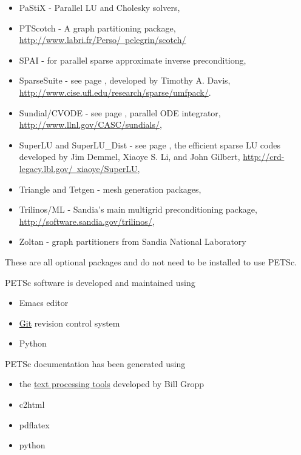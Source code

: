 \begin{itemize}
  \item PaStiX -     Parallel LU and Cholesky solvers,
  \item PTScotch -    A graph partitioning package, \href{http://www.labri.fr/Perso/~pelegrin/scotch/}{http://www.labri.fr/Perso/~pelegrin/scotch/}
  \item SPAI -        for parallel sparse approximate inverse preconditiong,
  \item SparseSuite - see page \pageref{sec_externalsol},  developed by Timothy A. Davis,
                    \href{http://www.cise.ufl.edu/research/sparse/umfpack/}{http://www.cise.ufl.edu/research/sparse/umfpack/}.
  \item Sundial/CVODE - see page \pageref{sec_sundials}, parallel ODE integrator,
                     \href{http://www.llnl.gov/CASC/sundials/}{http://www.llnl.gov/CASC/sundials/},
  \item SuperLU and SuperLU\_Dist - see page \pageref{sec_externalsol},
                    the efficient sparse LU codes developed by Jim Demmel,  Xiaoye S. Li, and John Gilbert,
                    \href{http://crd-legacy.lbl.gov/~xiaoye/SuperLU}{http://crd-legacy.lbl.gov/~xiaoye/SuperLU},
  \item Triangle and Tetgen - mesh generation packages,
  \item Trilinos/ML - Sandia's main multigrid preconditioning package, \href{http://software.sandia.gov/trilinos/}{http://software.sandia.gov/trilinos/},
  \item Zoltan - graph partitioners from Sandia National Laboratory
\end{itemize}
These are all optional packages and do not need to be installed to use PETSc.

PETSc software is developed and maintained using
\begin{itemize}
\item Emacs editor
\item \href{http://git-scm.com/}{Git} revision control system
\item Python
\end{itemize}

PETSc documentation has been generated using
\begin{itemize}
\item the \href{http://www.cs.uiuc.edu/~wgropp/projects/software/sowing/index.htm}{text processing tools} developed by Bill Gropp
\item c2html
\item pdflatex
\item python
\end{itemize}

